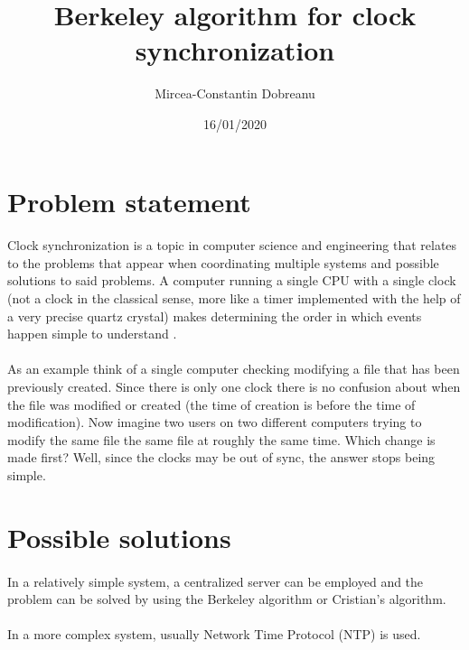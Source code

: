 \documentclass[12pt]{article}
\title{Berkeley algorithm for clock synchronization}
\author{Mircea-Constantin Dobreanu}
\date{16/01/2020}
\begin{document}
\maketitle


\section{Problem statement}

\paragraph{}
Clock synchronization is a topic in computer science and engineering that relates to the problems that appear when coordinating multiple systems and possible solutions to said problems. A computer running a single CPU with a single clock (not a clock in the classical sense, more like a timer implemented with the help of a very precise quartz crystal) makes determining the order in which events happen simple to understand \cite{tanenbaum2007distributed}.
\paragraph{}
As an example think of a single computer checking modifying a file that has been previously created. Since there is only one clock there is no confusion about when the file was modified or created (the time of creation is before the time of modification). Now imagine two users on two different computers trying to modify the same file the same file at roughly the same time. Which change is made first? Well, since the clocks may be out of sync, the answer stops being simple.

\section{Possible solutions}

\paragraph{}
In a relatively simple system, a centralized server can be employed and the problem can be solved by using the Berkeley algorithm or Cristian's algorithm.

\paragraph{}
In a more complex system, usually Network Time Protocol (NTP) is used.
\end{document}
